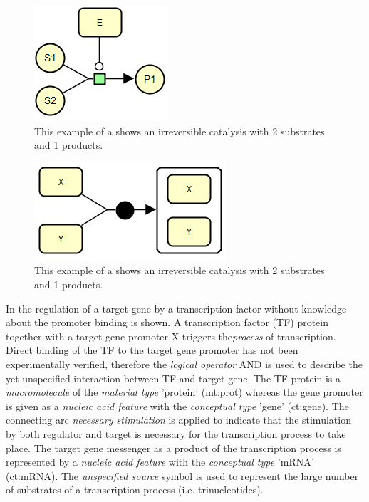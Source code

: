 \begin{figure}[h]
  \centering
  \vspace*{-0.75em}
  \includegraphics[scale=0.5]{images/Fig12}
  \caption{This example of a \PD shows an irreversible catalysis with 2 substrates and 1 products.}
  \label{fig:eg2}
\end{figure}

\begin{figure}[h]
  \centering
  \vspace*{-0.75em}
  \includegraphics[scale=0.5]{images/Fig13}
  \caption{This example of a \PD shows an irreversible catalysis with 2 substrates and 1 products.}
  \label{fig:eg3}
\end{figure}

In  the regulation of a target gene by a transcription factor without knowledge about the promoter binding is shown. A transcription factor (TF) protein together with a target gene promoter X triggers the\emph{process} of transcription. Direct binding of the TF to the target gene promoter has not been experimentally verified, therefore the \emph{logical operator} AND is used to describe the yet unspecified interaction between TF and target gene. The TF protein is a \emph{macromolecule} of the \emph{material type} 'protein' (mt:prot) whereas the gene promoter is given as a \emph{nucleic acid feature} with the \emph{conceptual type} 'gene' (ct:gene). The connecting arc \emph{necessary stimulation} is applied to indicate that the stimulation by both regulator and target is necessary for the transcription process to take place. The target gene messenger as a product of the transcription process is represented by a \emph{nucleic acid feature} with the \emph{conceptual type} 'mRNA' (ct:mRNA). The \emph{unspecified source} symbol is used to represent the large number of substrates of a transcription process (i.e. trinucleotides).

